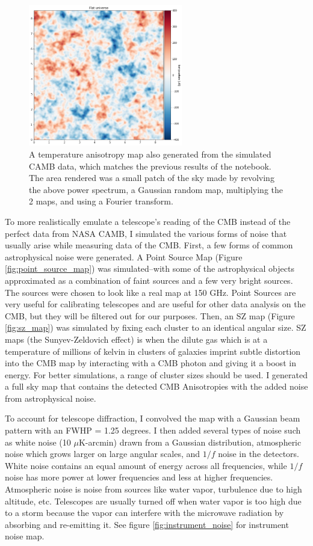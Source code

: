 \documentclass[12pt]{article}
\begin{document}
\begin{figure}[H]
    \centering
    \includegraphics[width=0.6\textwidth]{images/fa.png}
    \caption{A temperature anisotropy map also generated from the simulated CAMB data, which matches the previous results of the notebook. The area rendered was a small patch of the sky made by revolving the above power spectrum, a Gaussian random map, multiplying the 2 maps, and using a Fourier transform.}
    \label{fig:camb_temp}
\end{figure}

To more realistically emulate a telescope’s reading of the CMB instead of the perfect data from NASA CAMB, I simulated the various forms of noise that usually arise while measuring data of the CMB. First, a few forms of common astrophysical noise were generated. A Point Source Map (Figure \ref{fig:point_source_map}) was simulated–with some of the astrophysical objects approximated as a combination of faint sources and a few very bright sources. The sources were chosen to look like a real map at 150 GHz. Point Sources are very useful for calibrating telescopes and are useful for other data analysis on the CMB, but they will be filtered out for our purposes. Then, an SZ map (Figure \ref{fig:sz_map}) was simulated by fixing each cluster to an identical angular size. SZ maps (the Sunyev-Zeldovich effect) is when the dilute gas which is at a temperature of millions of kelvin in clusters of galaxies imprint subtle distortion into the CMB map by interacting with a CMB photon and giving it a boost in energy. For better simulations, a range of cluster sizes should be used. I generated a full sky map that contains the detected CMB Anisotropies with the added noise from astrophysical noise.

To account for telescope diffraction, I convolved the map with a Gaussian beam pattern with an FWHP = 1.25 degrees. I then added several types of noise such as white noise (10 $\mu$K-arcmin) drawn from a Gaussian distribution, atmospheric noise which grows larger on large angular scales, and $1/f$ noise in the detectors. White noise contains an equal amount of energy across all frequencies, while $1/f$ noise has more power at lower frequencies and less at higher frequencies. Atmospheric noise is noise from sources like water vapor, turbulence due to high altitude, etc. Telescopes are usually turned off when water vapor is too high due to a storm because the vapor can interfere with the microwave radiation by absorbing and re-emitting it. See figure \ref{fig:instrument_noise} for instrument noise map.
\end{document}
